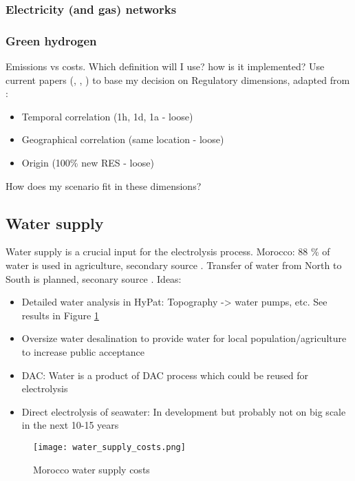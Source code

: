 \subsubsection{Electricity (and gas) networks}


\subsubsection{Green hydrogen}
Emissions vs costs. Which definition will I use? how is it implemented?
Use current papers (\cite{Brauer2022}, \cite{Ruhnau2022}, \cite{Zeyen2022a}) to base my decision on
Regulatory dimensions, adapted from \cite{Brauer2022}:
\begin{itemize}
    \item Temporal correlation (1h, 1d, 1a - loose) 
    \item Geographical correlation (same location - loose)
    \item Origin (100\% new RES - loose)
\end{itemize}
How does my scenario fit in these dimensions?

\subsection{Water supply}
\label{subsec:water_supply}
Water supply is a crucial input for the electrolysis process. 
Morocco: 88 \% of water is used in agriculture, secondary source \cite{Ersoy2022}.
Transfer of water from North to South is planned, seconary source \cite{Ersoy2022}.
Ideas:
\begin{itemize}
    \item Detailed water analysis in HyPat: Topography -> water pumps, etc. See results in Figure \ref{fig:morocco_water}
    \item Oversize water desalination to provide water for local population/agriculture to increase public acceptance
    \item DAC: Water is a product of DAC process which could be reused for electrolysis
    \item Direct electrolysis of seawater: In development but probably not on big scale in the next 10-15 years
\end{itemize}

\begin{figure}[h!]
    \centering
    \texttt{[image: water\_supply\_costs.png]}
    \caption{Morocco water supply costs}
    \label{fig:morocco_water}
\end{figure}


